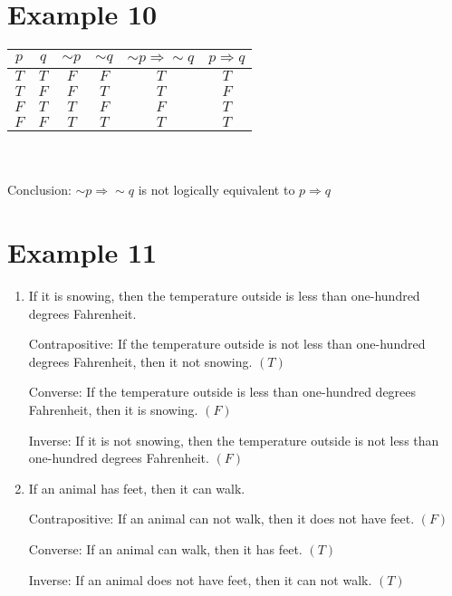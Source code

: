 \documentclass[12pt,a4paper]{article}
\begin{document}
\section*{Example 10}
\begin{tabular}{|c|c|c|c|c|c|}
	\hline
	$p$ & $q$ & $\sim p$ & $\sim q$ & $\sim p\Rightarrow \sim q$ & $p\Rightarrow q$\\ \hline
	$T$ & $T$ & $F$ & $F$ & $T$ & $T$\\ \hline
	$T$ & $F$ & $F$ & $T$ & $T$ & $F$\\ \hline
	$F$ & $T$ & $T$ & $F$ & $F$ & $T$\\ \hline
	$F$ & $F$ & $T$ & $T$ & $T$ & $T$\\ \hline
\end{tabular}
\\\\
Conclusion: $\sim p\Rightarrow \sim q$ is not logically equivalent to $p\Rightarrow q$

\section*{Example 11}
\begin{enumerate}
\item If it is snowing, then the temperature outside is less than one-hundred degrees Fahrenheit.

Contrapositive: If the temperature outside is not less than one-hundred degrees Fahrenheit, then it not snowing. $(T)$

Converse: If the temperature outside is less than one-hundred degrees Fahrenheit, then it is snowing. $(F)$

Inverse: If it is not snowing, then the temperature outside is not less than one-hundred degrees Fahrenheit. $(F)$


\item If an animal has feet, then it can walk.

Contrapositive: If an animal can not walk, then it does not have feet. $(F)$

Converse: If an animal can walk, then it has feet. $(T)$

Inverse: If an animal does not have feet, then it can not walk. $(T)$
\end{enumerate}
\end{document}
